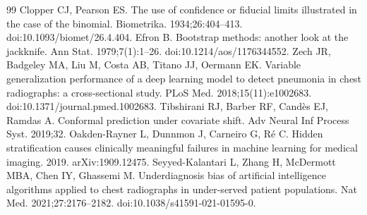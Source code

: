 \documentclass[10pt,a4paper]{article}
\begin{document}
\begin{thebibliography}{99}
 Clopper CJ, Pearson ES. The use of confidence or fiducial limits illustrated in the case of the binomial. Biometrika. 1934;26:404--413. doi:10.1093/biomet/26.4.404.
Efron B. Bootstrap methods: another look at the jackknife. Ann Stat. 1979;7(1):1--26. doi:10.1214/aos/1176344552.
Zech JR, Badgeley MA, Liu M, Costa AB, Titano JJ, Oermann EK. Variable generalization performance of a deep learning model to detect pneumonia in chest radiographs: a cross-sectional study. PLoS Med. 2018;15(11):e1002683. doi:10.1371/journal.pmed.1002683.
Tibshirani RJ, Barber RF, Cand\`es EJ, Ramdas A. Conformal prediction under covariate shift. Adv Neural Inf Process Syst. 2019;32.
Oakden-Rayner L, Dunnmon J, Carneiro G, R\'e C. Hidden stratification causes clinically meaningful failures in machine learning for medical imaging. 2019. arXiv:1909.12475.
Seyyed-Kalantari L, Zhang H, McDermott MBA, Chen IY, Ghassemi M. Underdiagnosis bias of artificial intelligence algorithms applied to chest radiographs in under-served patient populations. Nat Med. 2021;27:2176--2182. doi:10.1038/s41591-021-01595-0.
\end{thebibliography}
\end{document}
